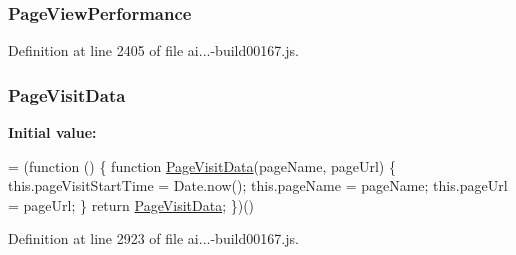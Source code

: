 \subsubsection[{\texorpdfstring{Page\+View\+Performance}{PageViewPerformance}}]{ Page\+View\+Performance}\hypertarget{obj_2_release_2_package_2_package_tmp_2_scripts_2ai_80_822_89-build00167_8js_a54e662eeb199e47ffb9a94a1e1373983}{}\label{obj_2_release_2_package_2_package_tmp_2_scripts_2ai_80_822_89-build00167_8js_a54e662eeb199e47ffb9a94a1e1373983}


Definition at line 2405 of file ai...-\/build00167.\+js.

\subsubsection[{\texorpdfstring{Page\+Visit\+Data}{PageVisitData}}]{ Page\+Visit\+Data}\hypertarget{obj_2_release_2_package_2_package_tmp_2_scripts_2ai_80_822_89-build00167_8js_aebc84d0ba279b4ed22995e577f2cdfd2}{}\label{obj_2_release_2_package_2_package_tmp_2_scripts_2ai_80_822_89-build00167_8js_aebc84d0ba279b4ed22995e577f2cdfd2}
{\bfseries Initial value\+:}
\begin{DoxyCode}
= (\textcolor{keyword}{function} () \{
                \textcolor{keyword}{function} \hyperlink{obj_2_release_2_package_2_package_tmp_2_scripts_2ai_80_822_89-build00167_8js_aebc84d0ba279b4ed22995e577f2cdfd2}{PageVisitData}(pageName, pageUrl) \{
                    this.pageVisitStartTime = Date.now();
                    this.pageName = pageName;
                    this.pageUrl = pageUrl;
                \}
                \textcolor{keywordflow}{return} \hyperlink{obj_2_release_2_package_2_package_tmp_2_scripts_2ai_80_822_89-build00167_8js_aebc84d0ba279b4ed22995e577f2cdfd2}{PageVisitData};
            \})()
\end{DoxyCode}


Definition at line 2923 of file ai...-\/build00167.\+js.

